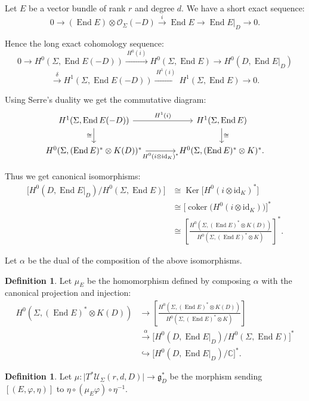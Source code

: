 \documentclass[12pt,a4paper,oneside,english]{smfart}
\theoremstyle{definition}
\newtheorem{defn}[thm]{Definition}
\theoremstyle{remark}
\DeclareMathOperator{\End}{End}
\DeclareMathOperator{\Ker}{Ker}
\DeclareMathOperator{\coker}{coker}
\newcommand{\cU}{\mathcal{U}}
\newcommand{\cO}{\mathcal{O}}
\newcommand{\tot}[1]{\lvert #1 \rvert}
\begin{document}
Let $E$ be a vector bundle of rank $r$ and degree $d$. We have a short exact sequence:
\[
0 \to (\End E) \otimes \cO_\Sigma(-D) \xrightarrow{\ i\ } \End E \to \End E|_D \to 0.
\]

Hence the long exact cohomology sequence:
\[
0 \to H^0(\Sigma, \End E(-D)) \xrightarrow{\ H^0(i)\ } H^0(\Sigma, \End E) \to H^0(D, \End E|_D)
\]
\[
\xrightarrow{\ \delta\ } H^1(\Sigma, \End E(-D)) \xrightarrow{\ H^1(i)\ } H^1(\Sigma, \End E) \to 0.
\]

Using Serre's duality we get the commutative diagram:
\[
\begin{tikzcd}[column sep=large]
H^1(\Sigma, \End E(-D)) \arrow[r, "H^1(i)"] \arrow[d, "\cong"'] & H^1(\Sigma, \End E) \arrow[d, "\cong"] \\
H^0(\Sigma, (\End E)^* \otimes K(D))^* \arrow[r, "{H^0(i \otimes \mathrm{id}_K)^*}"'] & H^0(\Sigma, (\End E)^* \otimes K)^*.
\end{tikzcd}
\]

Thus we get canonical isomorphisms:
\begin{align*}
\bigl[H^0(D, \End E|_D) / H^0(\Sigma, \End E)\bigr] &\cong \Ker\bigl[H^0(i \otimes \mathrm{id}_K)^*\bigr] \\
&\cong \bigl[\coker\bigl(H^0(i \otimes \mathrm{id}_K)\bigr)\bigr]^* \\
&\cong \left[\frac{H^0(\Sigma, (\End E)^* \otimes K(D))}{H^0(\Sigma, (\End E)^* \otimes K)}\right]^*.
\end{align*}

Let $\alpha$ be the dual of the composition of the above isomorphisms.

\begin{defn}\label{t6.9}
Let $\mu_E$ be the homomorphism defined by composing $\alpha$ with the canonical projection and injection:
\begin{align*}
H^0(\Sigma, (\End E)^* \otimes K(D)) &\to \left[\frac{H^0(\Sigma, (\End E)^* \otimes K(D))}{H^0(\Sigma, (\End E)^* \otimes K)}\right] \\
&\xrightarrow{\ \alpha\ } \bigl[H^0(D, \End E|_D) / H^0(\Sigma, \End E)\bigr]^* \\
&\hookrightarrow \bigl[H^0(D, \End E|_D) / \mathbb{C}\bigr]^*.
\end{align*}
\end{defn}

\begin{defn}\label{t6.10}
Let $\mu \colon \tot{T^*\cU_\Sigma(r, d, D)} \to \mathfrak{g}_D^*$ be the morphism sending $[(E, \varphi, \eta)]$ to $\eta \circ (\mu_E \varphi) \circ \eta^{-1}$.
\end{defn}
\end{document}
